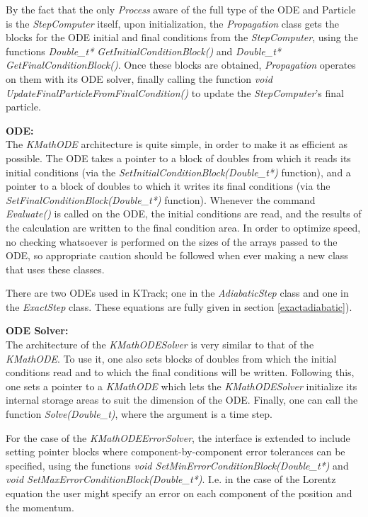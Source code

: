     By the fact that the only \textit{Process} aware of the full type of the ODE and Particle is the \textit{StepComputer} itself, upon initialization, the \textit{Propagation} class gets the blocks for the ODE initial and final conditions from the \textit{StepComputer}, using the functions \textit{Double\_t* GetInitialConditionBlock()} and \textit{Double\_t* GetFinalConditionBlock()}.  Once these blocks are obtained, \textit{Propagation} operates on them with its ODE solver, finally calling the function \textit{void UpdateFinalParticleFromFinalCondition()} to update the \textit{StepComputer}'s final particle.  
         
        \textbf{ODE:}\\
        The \textit{KMathODE} architecture is quite simple, in order to make it as efficient as possible.  The ODE takes a pointer to a block of doubles from which it reads its initial conditions (via the \textit{SetInitialConditionBlock(Double\_t*)} function), and a pointer to a block of doubles to which it writes its final conditions (via the \textit{SetFinalConditionBlock(Double\_t*)} function).  Whenever the command \textit{Evaluate()} is called on the ODE, the initial conditions are read, and the results of the calculation are written to the final condition area. In order to optimize speed, no checking whatsoever is performed on the sizes of the arrays passed to the ODE, so appropriate caution should be followed when ever making a new class that uses these classes.
        
        There are two ODEs used in KTrack; one in the \textit{AdiabaticStep} class and one in the \textit{ExactStep} class.  These equations are fully given in section \ref{exactadiabatic}).

        \textbf{ODE Solver:}\\         
        The architecture of the \textit{KMathODESolver} is very similar to that of the \textit{KMathODE}.  To use it, one also sets blocks of doubles from which the initial conditions read and to which the final conditions will be written.  Following this, one sets a pointer to a \textit{KMathODE} which lets the \textit{KMathODESolver} initialize its internal storage areas to suit the dimension of the ODE.  Finally, one can call the function \textit{Solve(Double\_t)}, where the argument is a time step.
        
        For the case of the \textit{KMathODEErrorSolver}, the interface is extended to include setting pointer blocks where component-by-component error tolerances can be specified, using the functions \textit{void SetMinErrorConditionBlock(Double\_t*)} and \textit{void SetMaxErrorConditionBlock(Double\_t*)}. I.e. in the case of the Lorentz equation the user might specify an error on each component of the position and the momentum.  
         
